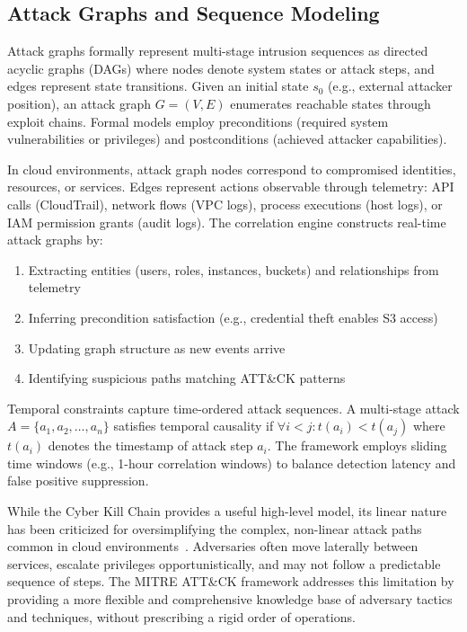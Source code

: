 \subsection{Attack Graphs and Sequence Modeling}
Attack graphs formally represent multi-stage intrusion sequences as directed acyclic graphs (DAGs) where nodes denote system states or attack steps, and edges represent state transitions. Given an initial state $s_0$ (e.g., external attacker position), an attack graph $G = (V, E)$ enumerates reachable states through exploit chains. Formal models employ preconditions (required system vulnerabilities or privileges) and postconditions (achieved attacker capabilities).

In cloud environments, attack graph nodes correspond to compromised identities, resources, or services. Edges represent actions observable through telemetry: API calls (CloudTrail), network flows (VPC logs), process executions (host logs), or IAM permission grants (audit logs). The correlation engine constructs real-time attack graphs by:
\begin{enumerate}
    \item Extracting entities (users, roles, instances, buckets) and relationships from telemetry
    \item Inferring precondition satisfaction (e.g., credential theft enables S3 access)
    \item Updating graph structure as new events arrive
    \item Identifying suspicious paths matching ATT\&CK patterns
\end{enumerate}

Temporal constraints capture time-ordered attack sequences. A multi-stage attack $A = \{a_1, a_2, \ldots, a_n\}$ satisfies temporal causality if $\forall i < j: t(a_i) < t(a_j)$ where $t(a_i)$ denotes the timestamp of attack step $a_i$. The framework employs sliding time windows (e.g., 1-hour correlation windows) to balance detection latency and false positive suppression.

While the Cyber Kill Chain provides a useful high-level model, its linear nature has been criticized for oversimplifying the complex, non-linear attack paths common in cloud environments~\cite{xcitium2024killchain}. Adversaries often move laterally between services, escalate privileges opportunistically, and may not follow a predictable sequence of steps. The MITRE ATT&CK framework addresses this limitation by providing a more flexible and comprehensive knowledge base of adversary tactics and techniques, without prescribing a rigid order of operations.

